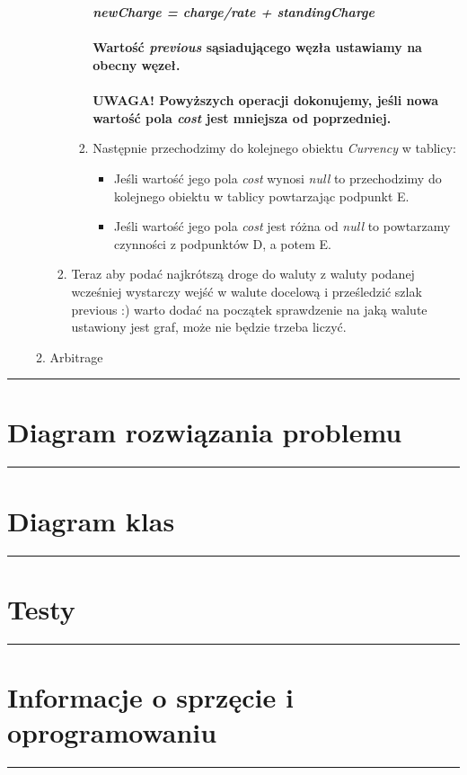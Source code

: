 \documentclass[a4paper,11pt]{article}
\newcommand{\linia}{\rule{\linewidth}{0.4mm}}
\begin{document}
\begin{enumerate}
\begin{enumerate}
\begin{enumerate}
\begin{enumerate}
\\
\\ \textbf{\emph{newCharge = charge/rate + standingCharge }}
\\
\\\textbf{Wartość \textit{previous} sąsiadującego węzła ustawiamy na obecny węzeł.}
\\
\textbf{\\ UWAGA! Powyższych operacji dokonujemy, jeśli nowa wartość pola \textit{cost} jest mniejsza od poprzedniej.}
\\
\item  Następnie przechodzimy do kolejnego obiektu \textit{Currency} w tablicy:
\begin{itemize}
\item Jeśli wartość jego pola \textit{cost} wynosi \textit{null} to przechodzimy do kolejnego obiektu w tablicy powtarzając podpunkt E.
\item Jeśli wartość jego pola \textit{cost} jest różna od \textit{null} to powtarzamy czynności z podpunktów D, a potem E.
\end{itemize}
\end{enumerate}
\item Teraz aby podać najkrótszą droge do waluty z waluty podanej wcześniej wystarczy wejść w walute docelową i prześledzić szlak previous :) warto dodać na początek sprawdzenie na jaką walute ustawiony jest graf, może nie będzie trzeba liczyć.
\end{enumerate} 
\item Arbitrage
\end{enumerate}
\end{enumerate}

\noindent\linia
\section{Diagram rozwiązania problemu}


\noindent\linia
\section{Diagram klas}


\noindent\linia
\section{Testy}


\noindent\linia
\section{Informacje o sprzęcie i oprogramowaniu}

\noindent\linia
\end{document}
